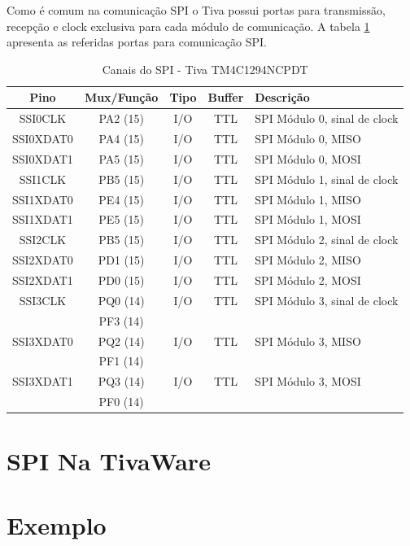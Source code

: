 Como é comum na comunicação SPI o Tiva possui portas para transmissão, recepção e clock exclusiva para cada  módulo de comunicação. A tabela \ref{tab:CanaisSPI} apresenta as referidas portas para comunicação SPI.

\begin{table}[H]
	\centering
	\caption{Canais do SPI - Tiva TM4C1294NCPDT \cite{DATASHEET_TIVA} }
	\label{tab:CanaisSPI}
	\begin{tabular}{|c|c|c|c|l|}
		\rowcolor[HTML]{000000} 
		{\color[HTML]{FFFFFF} Pino}  & {\color[HTML]{FFFFFF} Mux/Função} & {\color[HTML]{FFFFFF} Tipo} & {\color[HTML]{FFFFFF} Buffer} & {\color[HTML]{FFFFFF} Descrição}  \\
		\hline
		SSI0CLK   & PA2 (15) & I/O & TTL & SPI Módulo 0, sinal de clock   \\
		\hline
		SSI0XDAT0 & PA4 (15) & I/O & TTL & SPI Módulo 0, MISO \\
		\hline
		SSI0XDAT1 & PA5 (15) & I/O & TTL & SPI Módulo 0, MOSI \\
		\hline
		SSI1CLK   & PB5 (15) & I/O & TTL & SPI Módulo 1, sinal de clock   \\
		\hline
		SSI1XDAT0 & PE4 (15) & I/O & TTL & SPI Módulo 1, MISO  \\
		\hline
		SSI1XDAT1 & PE5 (15) & I/O & TTL & SPI Módulo 1, MOSI  \\
		\hline
		SSI2CLK   & PB5 (15) & I/O & TTL & SPI Módulo 2, sinal de clock   \\
		\hline
		SSI2XDAT0 & PD1 (15) & I/O & TTL & SPI Módulo 2, MISO  \\
		\hline
		SSI2XDAT1 & PD0 (15) & I/O & TTL & SPI Módulo 2, MOSI  \\
		\hline
		SSI3CLK   & PQ0 (14) & I/O & TTL & SPI Módulo 3, sinal de clock   \\
		          & PF3 (14) &     &     &                                \\
		\hline
		SSI3XDAT0 & PQ2 (14) & I/O & TTL & SPI Módulo 3, MISO  \\
		          & PF1 (14) &     &     &                     \\
		\hline
		SSI3XDAT1 & PQ3 (14) & I/O & TTL & SPI Módulo 3, MOSI  \\
		          & PF0 (14) &     &     &                     \\
		\hline
	\end{tabular}
\end{table}


\section{SPI Na TivaWare}

\section{Exemplo}